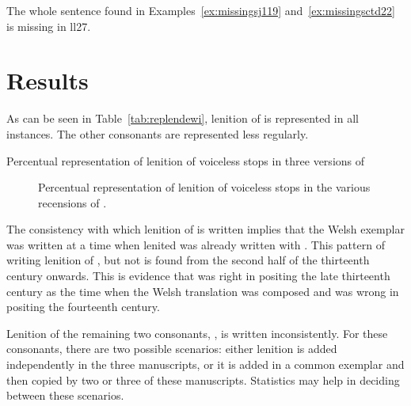 \begin{mwl}
\end{mwl}

The whole sentence found in Examples~\ref{ex:missingsj119} and~\ref{ex:missingsctd22} is missing in \gls{ll27}.

\section{Results}
\label{sec:results-1}
As can be seen in Table~\ref{tab:replendewi}, lenition of  is represented in all instances. The other consonants are represented less regularly.
\begin{table}[h]
  \centering
  
  \caption{Percentual representation of lenition of voiceless stops in three versions of }
  \label{tab:replendewi}
\end{table} 

\begin{figure}[h]
  \centering
  
  \caption{Percentual representation of lenition of voiceless stops in the various recensions of .}
  \label{fig:barchartdewi}
\end{figure}



The consistency with which lenition of  is written implies that the Welsh exemplar was written at a time when lenited  was already written with . This pattern of writing lenition of , but not  is found from the second half of the thirteenth century onwards. This is evidence that \textcite{Rob_Ystoriaeu11} was right in positing the late thirteenth century as the time when the Welsh translation was composed and \textcite{Eva_Welsh88} was wrong in positing the fourteenth century.

Lenition of the remaining two consonants, , is written inconsistently. For these consonants, there are two possible scenarios: either lenition is added independently in the three manuscripts, or it is added in a common exemplar and then copied by two or three of these manuscripts. Statistics may help in deciding between these scenarios.

